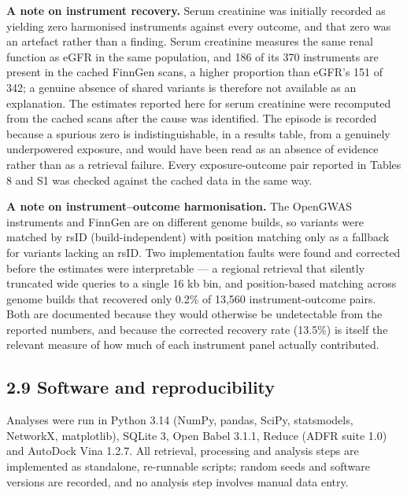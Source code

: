\documentclass[utf8]{FrontiersinVancouver}
\begin{document}
\textbf{A note on instrument recovery.} Serum creatinine was initially recorded as yielding zero harmonised instruments against every outcome, and that zero was an artefact rather than a finding. Serum creatinine measures the same renal function as eGFR in the same population, and 186 of its 370 instruments are present in the cached FinnGen scans, a higher proportion than eGFR's 151 of 342; a genuine absence of shared variants is therefore not available as an explanation. The estimates reported here for serum creatinine were recomputed from the cached scans after the cause was identified. The episode is recorded because a spurious zero is indistinguishable, in a results table, from a genuinely underpowered exposure, and would have been read as an absence of evidence rather than as a retrieval failure. Every exposure-outcome pair reported in Tables 8 and S1 was checked against the cached data in the same way.

\textbf{A note on instrument--outcome harmonisation.} The OpenGWAS instruments and FinnGen are on different genome builds, so variants were matched by rsID (build-independent) with position matching only as a fallback for variants lacking an rsID. Two implementation faults were found and corrected before the estimates were interpretable --- a regional retrieval that silently truncated wide queries to a single 16 kb bin, and position-based matching across genome builds that recovered only 0.2\% of 13,560 instrument-outcome pairs. Both are documented because they would otherwise be undetectable from the reported numbers, and because the corrected recovery rate (13.5\%) is itself the relevant measure of how much of each instrument panel actually contributed.

\subsection{2.9 Software and reproducibility}

Analyses were run in Python 3.14 (NumPy, pandas, SciPy, statsmodels, NetworkX, matplotlib), SQLite 3, Open Babel 3.1.1, Reduce (ADFR suite 1.0) and AutoDock Vina 1.2.7. All retrieval, processing and analysis steps are implemented as standalone, re-runnable scripts; random seeds and software versions are recorded, and no analysis step involves manual data entry.
\end{document}
